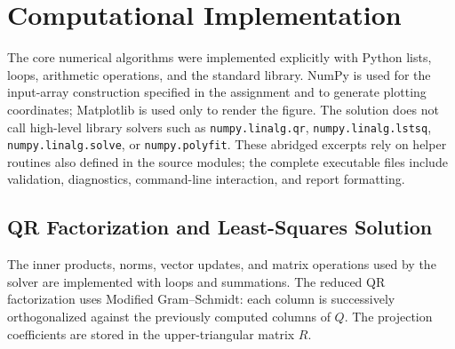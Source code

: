
\section{Computational Implementation}
\label{app:computational-implementation}

The core numerical algorithms were implemented explicitly with Python lists,
loops, arithmetic operations, and the standard library. NumPy is used for the
input-array construction specified in the assignment and to generate plotting
coordinates; Matplotlib is used only to render the figure. The solution does
not call high-level library solvers such as \texttt{numpy.linalg.qr},
\texttt{numpy.linalg.lstsq}, \texttt{numpy.linalg.solve}, or
\texttt{numpy.polyfit}. These abridged excerpts rely on helper routines also
defined in the source modules; the complete executable files include
validation, diagnostics, command-line interaction, and report formatting.

\subsection{QR Factorization and Least-Squares Solution}

The inner products, norms, vector updates, and matrix operations used by the
solver are implemented with loops and summations. The reduced QR factorization
uses Modified Gram--Schmidt: each column is successively orthogonalized
against the previously computed columns of $Q$. The projection coefficients
are stored in the upper-triangular matrix $R$.

